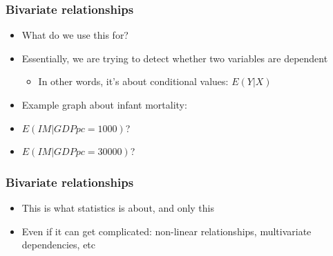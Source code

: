 \documentclass[aspectratio=43]{beamer}
\begin{document}





\begin{frame}
\frametitle{Bivariate relationships}
\centering

\begin{itemize}[<+->]
  \item<1-> What do we use this for?
  \item<2-> Essentially, we are trying to detect whether two variables are dependent
  \begin{itemize}
    \item In other words, it's about conditional values: $E(Y|X)$
  \end{itemize}
  \item<3-> Example graph about infant mortality:
  \item<3->[] $E(IM|GDPpc = 1000)$?
  \item<3->[] $E(IM|GDPpc = 30000)$?
\end{itemize}

\end{frame}

\begin{frame}
\frametitle{Bivariate relationships}
\centering

\begin{itemize}[<+->]
  \item This is what statistics is about, and only this
  \item Even if it can get complicated: non-linear relationships, multivariate dependencies, etc
\end{itemize}

\end{frame}
\end{document}
